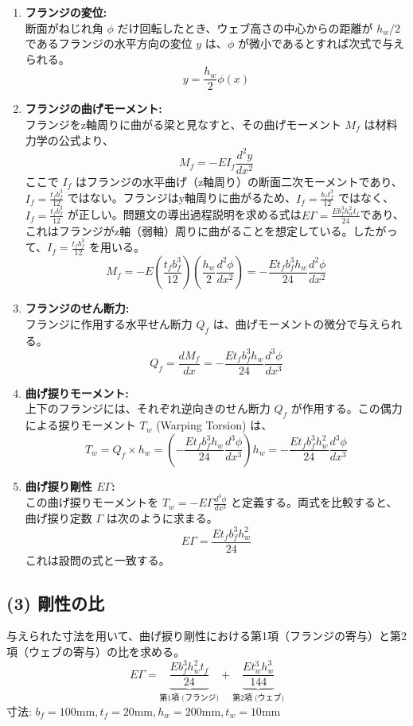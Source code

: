 \documentclass[a4j,12pt]{jsarticle}
\begin{document}
\begin{enumerate}
    \item \textbf{フランジの変位:} \\
    断面がねじれ角 $\phi$ だけ回転したとき、ウェブ高さの中心からの距離が $h_w/2$ であるフランジの水平方向の変位 $y$ は、$\phi$ が微小であるとすれば次式で与えられる。
    $$y = \frac{h_w}{2} \phi(x)$$

    \item \textbf{フランジの曲げモーメント:} \\
    フランジをz軸周りに曲がる梁と見なすと、その曲げモーメント $M_f$ は材料力学の公式より、
    $$M_f = -E I_f \frac{d^2 y}{d x^2}$$
    ここで $I_f$ はフランジの水平曲げ（z軸周り）の断面二次モーメントであり、$I_f = \frac{t_f b_f^3}{12}$ ではない。フランジはy軸周りに曲がるため、$I_f = \frac{b_f t_f^3}{12}$ ではなく、$I_f = \frac{t_f b_f^3}{12}$ が正しい。問題文の導出過程説明を求める式は$E\Gamma=\frac{Eb_{f}^{3}h_{w}^{2}t_{f}}{24}$であり、これはフランジがz軸（弱軸）周りに曲がることを想定している。したがって、$I_f = \frac{t_f b_f^3}{12}$ を用いる。
    $$M_f = -E \left( \frac{t_f b_f^3}{12} \right) \left( \frac{h_w}{2} \frac{d^2 \phi}{d x^2} \right) = -\frac{E t_f b_f^3 h_w}{24} \frac{d^2 \phi}{d x^2}$$

    \item \textbf{フランジのせん断力:} \\
    フランジに作用する水平せん断力 $Q_f$ は、曲げモーメントの微分で与えられる。
    $$Q_f = \frac{d M_f}{d x} = -\frac{E t_f b_f^3 h_w}{24} \frac{d^3 \phi}{d x^3}$$

    \item \textbf{曲げ捩りモーメント:} \\
    上下のフランジには、それぞれ逆向きのせん断力 $Q_f$ が作用する。この偶力による捩りモーメント $T_w$ (Warping Torsion) は、
    $$T_w = Q_f \times h_w = \left( -\frac{E t_f b_f^3 h_w}{24} \frac{d^3 \phi}{d x^3} \right) h_w = -\frac{E t_f b_f^3 h_w^2}{24} \frac{d^3 \phi}{d x^3}$$

    \item \textbf{曲げ捩り剛性 $E\Gamma$:} \\
    この曲げ捩りモーメントを $T_w = -E\Gamma \frac{d^3\phi}{dx^3}$ と定義する。両式を比較すると、曲げ捩り定数 $\Gamma$ は次のように求まる。
    $$E\Gamma = \frac{E t_f b_f^3 h_w^2}{24}$$
    これは設問の式と一致する。
\end{enumerate}

\subsection*{(3) 剛性の比}
与えられた寸法を用いて、曲げ捩り剛性における第1項（フランジの寄与）と第2項（ウェブの寄与）の比を求める。
$$E\Gamma = \underbrace{\frac{E b_f^3 h_w^2 t_f}{24}}_{\text{第1項 (フランジ)}} + \underbrace{\frac{E t_w^3 h_w^3}{144}}_{\text{第2項 (ウェブ)}}$$
寸法: $b_f=100 \text{mm}, t_f=20 \text{mm}, h_w=200 \text{mm}, t_w=10 \text{mm}$
\end{document}
